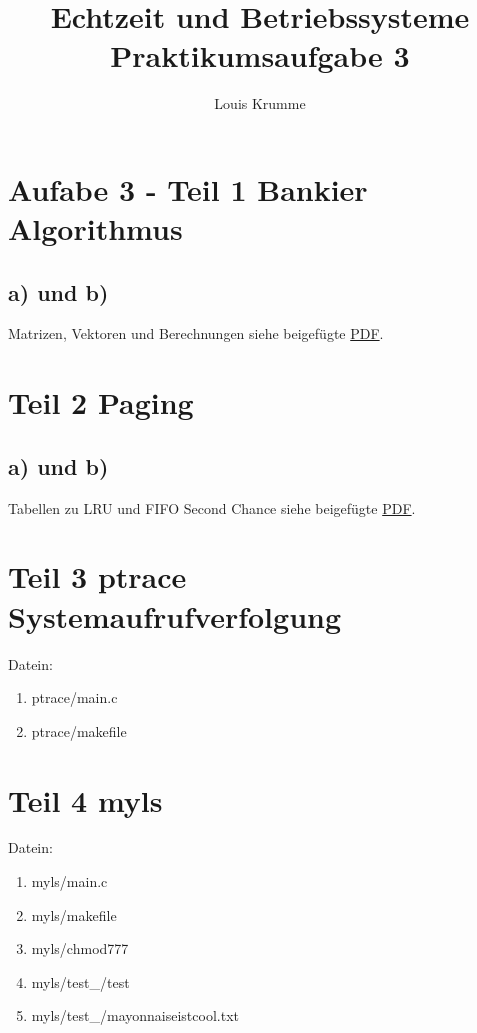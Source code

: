 \documentclass[a4paper,10pt]{article}
\title{Echtzeit und Betriebssysteme Praktikumsaufgabe 3}
\author{Louis Krumme}
\begin{document}
\maketitle

\section{Aufabe 3 - Teil 1 Bankier Algorithmus}
\subsection{a) und b) }
Matrizen, Vektoren und Berechnungen siehe beigefügte \href{berechnungen_bankier_algorithmus.pdf}{PDF}.
\section{Teil 2 Paging}

\subsection{a) und b) }
Tabellen zu LRU und FIFO Second Chance siehe beigefügte \href{berechnungen_paging.pdf}{PDF}.

\section{Teil 3 ptrace Systemaufrufverfolgung}
Datein:
\begin{enumerate}
 \item ptrace/main.c
 \item ptrace/makefile
\end{enumerate}

\section{Teil 4 myls}
Datein:
\begin{enumerate}
 \item myls/main.c
 \item myls/makefile
 \item myls/chmod777
 \item myls/test\_/test
 \item myls/test\_/mayonnaiseistcool.txt
\end{enumerate}
\end{document}
